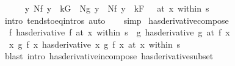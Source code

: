\begin{isabellebody}
\ \ \ \ \isamarkupfalse%
\ {\isachardoublequoteopen}{\isacharparenleft}{\kern0pt}{\isacharparenleft}{\kern0pt}{\isasymlambda}y{\isachardot}{\kern0pt}\ Nf\ y\ {\isacharasterisk}{\kern0pt}\ kG\ {\isacharplus}{\kern0pt}\ Ng\ y\ {\isacharasterisk}{\kern0pt}\ {\isacharparenleft}{\kern0pt}Nf\ y\ {\isacharplus}{\kern0pt}\ kF{\isacharparenright}{\kern0pt}{\isacharparenright}{\kern0pt}\ {\isasymlonglongrightarrow}\ {}{\isacharparenright}{\kern0pt}\ {\isacharparenleft}{\kern0pt}at\ x\ within\ s{\isacharparenright}{\kern0pt}{\isachardoublequoteclose}\isanewline
\ \ \ \ \ \ \isamarkupfalse%
\ {\isacharparenleft}{\kern0pt}intro\ tendsto{\isacharunderscore}{\kern0pt}eq{\isacharunderscore}{\kern0pt}intros{\isacharparenright}{\kern0pt}\ auto\isanewline
\ \ \isamarkupfalse%
\ simp\isanewline
{}\isamarkupfalse%
%
\endisatagproof
{\isafoldproof}%
%
\isadelimproof
\isanewline
%
\endisadelimproof
\isanewline
{}\isamarkupfalse%
\ has{\isacharunderscore}{\kern0pt}derivative{\isacharunderscore}{\kern0pt}compose{\isacharcolon}{\kern0pt}\isanewline
\ \ {\isachardoublequoteopen}{\isacharparenleft}{\kern0pt}f\ has{\isacharunderscore}{\kern0pt}derivative\ f{\isacharprime}{\kern0pt}{\isacharparenright}{\kern0pt}\ {\isacharparenleft}{\kern0pt}at\ x\ within\ s{\isacharparenright}{\kern0pt}\ {\isasymLongrightarrow}\ {\isacharparenleft}{\kern0pt}g\ has{\isacharunderscore}{\kern0pt}derivative\ g{\isacharprime}{\kern0pt}{\isacharparenright}{\kern0pt}\ {\isacharparenleft}{\kern0pt}at\ {\isacharparenleft}{\kern0pt}f\ x{\isacharparenright}{\kern0pt}{\isacharparenright}{\kern0pt}\ {\isasymLongrightarrow}\isanewline
\ \ {\isacharparenleft}{\kern0pt}{\isacharparenleft}{\kern0pt}{\isasymlambda}x{\isachardot}{\kern0pt}\ g\ {\isacharparenleft}{\kern0pt}f\ x{\isacharparenright}{\kern0pt}{\isacharparenright}{\kern0pt}\ has{\isacharunderscore}{\kern0pt}derivative\ {\isacharparenleft}{\kern0pt}{\isasymlambda}x{\isachardot}{\kern0pt}\ g{\isacharprime}{\kern0pt}\ {\isacharparenleft}{\kern0pt}f{\isacharprime}{\kern0pt}\ x{\isacharparenright}{\kern0pt}{\isacharparenright}{\kern0pt}{\isacharparenright}{\kern0pt}\ {\isacharparenleft}{\kern0pt}at\ x\ within\ s{\isacharparenright}{\kern0pt}{\isachardoublequoteclose}\isanewline
%
\isadelimproof
\ \ %
\endisadelimproof
%
\isatagproof
{}\isamarkupfalse%
\ {\isacharparenleft}{\kern0pt}blast\ intro{\isacharcolon}{\kern0pt}\ has{\isacharunderscore}{\kern0pt}derivative{\isacharunderscore}{\kern0pt}in{\isacharunderscore}{\kern0pt}compose\ has{\isacharunderscore}{\kern0pt}derivative{\isacharunderscore}{\kern0pt}subset{\isacharparenright}{\kern0pt}%

\end{isabellebody}
